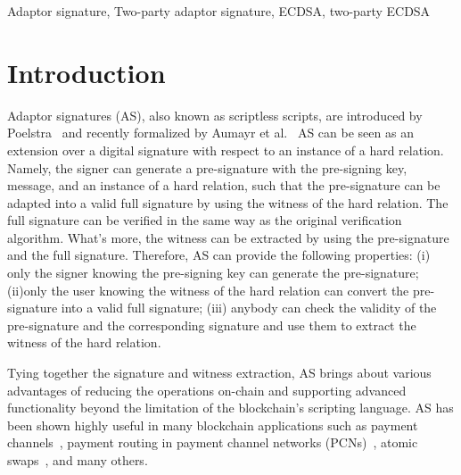 \documentclass{llncs}
\begin{document}
\begin{keywords}
Adaptor signature, Two-party adaptor signature, ECDSA, two-party ECDSA
\end{keywords}

\section{Introduction}

Adaptor signatures (AS), also known as scriptless scripts, are introduced by Poelstra~\cite{Poelstra2017} and recently formalized by Aumayr et al.~\cite{AumayrEEFHMMR20} AS can be seen as an extension over a digital signature with respect to an instance of a hard relation. Namely, the signer can generate a pre-signature with the pre-signing key, message, and an instance of a hard relation, such that the pre-signature can be adapted into a valid full signature by using the witness of the hard relation. The full signature can be verified in the same way as the original verification algorithm. What's more, the witness can be extracted by using the pre-signature and the full signature. Therefore, AS can provide the following properties: (i) only the signer knowing the pre-signing key can generate the pre-signature; (ii)only the user knowing the witness of the hard relation can convert the pre-signature into a valid full signature; (iii) anybody can check the validity of the pre-signature and the corresponding signature and use them to extract the witness of the hard relation. 

Tying together the signature and witness extraction, AS brings about various advantages of reducing the operations on-chain and supporting advanced functionality beyond the limitation of the blockchain’s scripting language. AS has been shown highly useful in many blockchain applications such as payment channels~\cite{AumayrEEFHMMR20,PC2018,DeckerW15,PD2016,AumayrEEFHMMR20a}, payment routing in payment channel networks (PCNs)~\cite{EckeyFHR20,MalavoltaMSKM19,MillerBBKM19,EsginEE20}, atomic swaps~\cite{DeshpandeH20,Gugger20,EsginEE20}, and many others.
\end{document}
